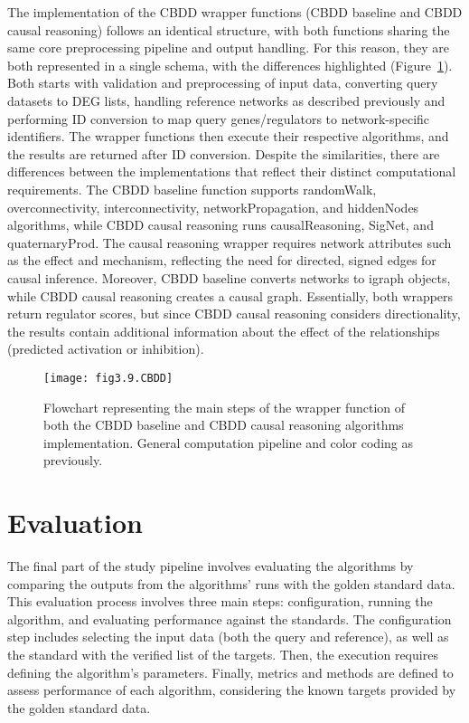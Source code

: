 The implementation of the \gls{CBDD} wrapper functions (CBDD baseline and CBDD causal reasoning) follows an identical structure, with both functions sharing the same core preprocessing pipeline and output handling. For this reason, they are both represented in a single schema, with the differences highlighted (Figure~\ref{fig:fig3.9.CBDD}). Both starts with validation and preprocessing of input data, converting query datasets to DEG lists, handling reference networks as described previously and performing ID conversion to map query genes/regulators to network-specific identifiers. The wrapper functions then execute their respective algorithms, and the results are returned after ID conversion. Despite the similarities, there are differences between the implementations that reflect their distinct computational requirements. The CBDD baseline function supports randomWalk, overconnectivity, interconnectivity, networkPropagation, and hiddenNodes algorithms, while CBDD causal reasoning runs causalReasoning, SigNet, and quaternaryProd. The causal reasoning wrapper requires network attributes such as the effect and mechanism, reflecting the need for directed, signed edges for causal inference. Moreover, CBDD baseline converts networks to igraph objects, while CBDD causal reasoning creates a causal graph. Essentially, both wrappers return regulator scores, but since CBDD causal reasoning considers directionality, the results contain additional information about the effect of the relationships (predicted activation or inhibition).

\begin{figure}[htbp]
    \centering
    \texttt{[image: fig3.9.CBDD]}
    \caption[Flowchart representing the main steps of the wrapper function of both the CBDD baseline and CBDD causal reasoning algorithms implementation.]{Flowchart representing the main steps of the wrapper function of both the CBDD baseline and CBDD causal reasoning algorithms implementation. General computation pipeline and color coding as previously.}
    \label{fig:fig3.9.CBDD}
\end{figure}


\section{Evaluation} %
\label{sec:evaluation}


The final part of the study pipeline involves evaluating the algorithms by comparing the outputs from the algorithms' runs with the golden standard data. This evaluation process involves three main steps: configuration, running the algorithm, and evaluating performance against the standards. The configuration step includes selecting the input data (both the query and reference), as well as the standard with the verified list of the targets. Then, the execution requires defining the algorithm's parameters. Finally, metrics and methods are defined to assess performance of each algorithm, considering the known targets provided by the golden standard data. 

